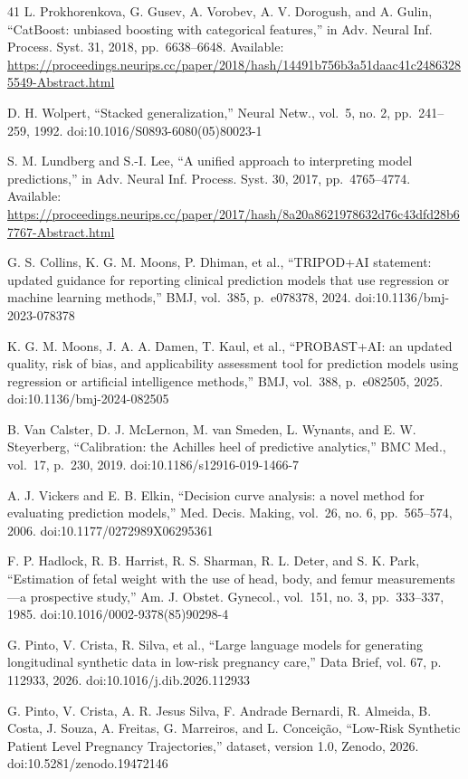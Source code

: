 \documentclass[conference]{IEEEtran}
\begin{document}
\begin{thebibliography}{41}
 L. Prokhorenkova, G. Gusev, A. Vorobev, A. V. Dorogush, and A. Gulin, ``CatBoost: unbiased boosting with categorical features,'' in Adv. Neural Inf. Process. Syst. 31, 2018, pp.~6638--6648. Available: \url{https://proceedings.neurips.cc/paper/2018/hash/14491b756b3a51daac41c24863285549-Abstract.html}

 D. H. Wolpert, ``Stacked generalization,'' Neural Netw., vol.~5, no. 2, pp.~241--259, 1992. doi:10.1016/S0893-6080(05)80023-1

 S. M. Lundberg and S.-I. Lee, ``A unified approach to interpreting model predictions,'' in Adv. Neural Inf. Process. Syst. 30, 2017, pp.~4765--4774. Available: \url{https://proceedings.neurips.cc/paper/2017/hash/8a20a8621978632d76c43dfd28b67767-Abstract.html}

 G. S. Collins, K. G. M. Moons, P. Dhiman, et al., ``TRIPOD+AI statement: updated guidance for reporting clinical prediction models that use regression or machine learning methods,'' BMJ, vol.~385, p.~e078378, 2024. doi:10.1136/bmj-2023-078378

 K. G. M. Moons, J. A. A. Damen, T. Kaul, et al., ``PROBAST+AI: an updated quality, risk of bias, and applicability assessment tool for prediction models using regression or artificial intelligence methods,'' BMJ, vol.~388, p.~e082505, 2025. doi:10.1136/bmj-2024-082505

 B. Van Calster, D. J. McLernon, M. van Smeden, L. Wynants, and E. W. Steyerberg, ``Calibration: the Achilles heel of predictive analytics,'' BMC Med., vol.~17, p.~230, 2019. doi:10.1186/s12916-019-1466-7

 A. J. Vickers and E. B. Elkin, ``Decision curve analysis: a novel method for evaluating prediction models,'' Med. Decis. Making, vol.~26, no. 6, pp.~565--574, 2006. doi:10.1177/0272989X06295361

 F. P. Hadlock, R. B. Harrist, R. S. Sharman, R. L. Deter, and S. K. Park, ``Estimation of fetal weight with the use of head, body, and femur measurements---a prospective study,'' Am. J. Obstet. Gynecol., vol.~151, no. 3, pp.~333--337, 1985. doi:10.1016/0002-9378(85)90298-4

 G. Pinto, V. Crista, R. Silva, et al., ``Large language models for generating longitudinal synthetic data in low-risk pregnancy care,'' Data Brief, vol. 67, p. 112933, 2026. doi:10.1016/j.dib.2026.112933

 G. Pinto, V. Crista, A. R. Jesus Silva, F. Andrade Bernardi, R. Almeida, B. Costa, J. Souza, A. Freitas, G. Marreiros, and L. Conceição, ``Low-Risk Synthetic Patient Level Pregnancy Trajectories,'' dataset, version 1.0, Zenodo, 2026. doi:10.5281/zenodo.19472146


\end{thebibliography}
\end{document}
